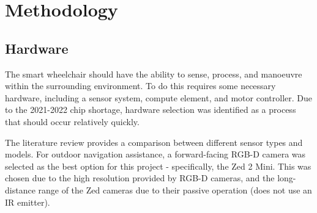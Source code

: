 \documentclass[12pt]{article}
\begin{document}




\pagebreak





\section{Methodology}

\subsection{Hardware}
The smart wheelchair should have the ability to sense, process, and manoeuvre within the surrounding environment.
To do this requires some necessary hardware, including a sensor system, compute element, and motor controller.
Due to the 2021-2022 chip shortage, hardware selection was identified as a process that should occur relatively quickly.

The literature review provides a comparison between different sensor types and models. For outdoor navigation assistance,
a forward-facing RGB-D camera was selected as the best option for this project - specifically, the Zed 2 Mini.
This was chosen due to the high resolution provided by RGB-D cameras, and the long-distance range of the Zed cameras due to 
their passive operation (does not use an IR emitter).
\end{document}
